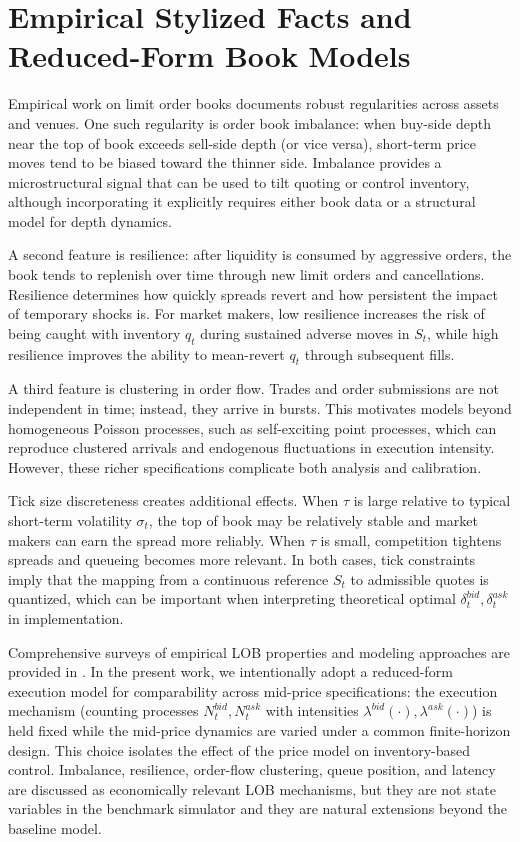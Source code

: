 \documentclass[a4paper,10pt,titlepage,oneside,openany]{book}
\providecommand{\textcite}[1]{\cite{#1}}
\theoremstyle{plain}\newtheorem{theorem}{Theorem}[chapter]
\theoremstyle{definition}\newtheorem{definition}{Definition}[chapter]
\theoremstyle{remark}\newtheorem{remark}{Remark}[chapter]
\begin{document}
\section{Empirical Stylized Facts and Reduced-Form Book Models}
Empirical work on limit order books documents robust regularities across assets and venues. One such regularity is order book imbalance: when buy-side depth near the top of book exceeds sell-side depth (or vice versa), short-term price moves tend to be biased toward the thinner side. Imbalance provides a microstructural signal that can be used to tilt quoting or control inventory, although incorporating it explicitly requires either book data or a structural model for depth dynamics.

A second feature is resilience: after liquidity is consumed by aggressive orders, the book tends to replenish over time through new limit orders and cancellations. Resilience determines how quickly spreads revert and how persistent the impact of temporary shocks is. For market makers, low resilience increases the risk of being caught with inventory $q_t$ during sustained adverse moves in $S_t$, while high resilience improves the ability to mean-revert $q_t$ through subsequent fills.

A third feature is clustering in order flow. Trades and order submissions are not independent in time; instead, they arrive in bursts. This motivates models beyond homogeneous Poisson processes, such as self-exciting point processes, which can reproduce clustered arrivals and endogenous fluctuations in execution intensity. However, these richer specifications complicate both analysis and calibration.

Tick size discreteness creates additional effects. When $\tau$ is large relative to typical short-term volatility $\sigma_t$, the top of book may be relatively stable and market makers can earn the spread more reliably. When $\tau$ is small, competition tightens spreads and queueing becomes more relevant. In both cases, tick constraints imply that the mapping from a continuous reference $S_t$ to admissible quotes is quantized, which can be important when interpreting theoretical optimal $\delta_t^{bid},\delta_t^{ask}$ in implementation.

Comprehensive surveys of empirical LOB properties and modeling approaches are provided in \textcite{GouldEtAl2013}. In the present work, we intentionally adopt a reduced-form execution model for comparability across mid-price specifications: the execution mechanism (counting processes $N_t^{bid},N_t^{ask}$ with intensities $\lambda^{bid}(\cdot),\lambda^{ask}(\cdot)$) is held fixed while the mid-price dynamics are varied under a common finite-horizon design. This choice isolates the effect of the price model on inventory-based control. Imbalance, resilience, order-flow clustering, queue position, and latency are discussed as economically relevant LOB mechanisms, but they are not state variables in the benchmark simulator and they are natural extensions beyond the baseline model.
\end{document}

